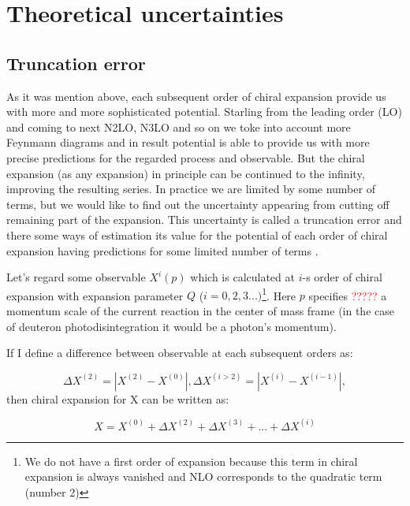 \section{Theoretical uncertainties}
    
    \subsection*{Truncation error}
    \label{sec:trunc}

    As it was mention above, each subsequent order of chiral
    expansion provide us with more and more sophisticated
    potential. Starling from the leading order (LO) and coming to next
    N2LO, N3LO and so on we toke into account more Feynmann diagrams 
    and in result potential is able to provide us with more precise predictions
    for the regarded process and observable. But the chiral expansion (as any expansion) 
    in principle can be continued to the infinity, improving the resulting series.
    In practice we are limited by some number of terms, but we would like to find out
    the uncertainty appearing from cutting off remaining part of the expansion.
    This uncertainty is called a truncation error and there some ways of estimation its value
    for the potential of each order of chiral expansion having predictions for some limited number
    of terms \cite{Epelbaum2015_trunc, Epelbaum2014SCS, Binder2015, Epelbaum_pos}.

    Let's regard some observable $X^i(p)$ which is calculated at $i$-s order of chiral expansion 
    with expansion parameter $Q$ ($i = 0,2,3...)$\footnote{We do not have a first order of expansion
    because this term in chiral expansion is always vanished
    and NLO  corresponds to the quadratic term (number 2)}.
    Here $p$ specifies
    {\textcolor{red}{?????}} a momentum
    scale of the current reaction in the center of mass frame (in the case of deuteron photodisintegration it would be a
    photon's momentum).  

    If I define a difference between observable at each subsequent orders as:

    \begin{equation}
        \Delta X^{(2)} = |X^{(2)} - X^{(0)}|, \Delta X^{(i>2)} = |X^{(i)} - X^{(i-1)}|,
    \end{equation}
    then chiral expansion for X can be written as:

    \begin{equation}
        X = X^{(0)} + \Delta X^{(2)} + \Delta X^{(3)} + ... + \Delta X^{(i)}
        \label{trunc1}
    \end{equation}
        
